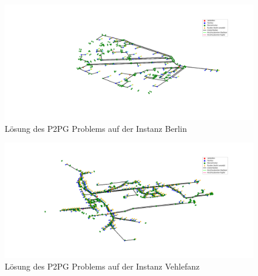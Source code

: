 \documentclass[11pt,a4paper]{article}
\theoremstyle{my_th_style1}
\begin{document}
\begin{figure}[h]
\begin{center}
	\begin{minipage}{12.0cm}
		\includegraphics[width=1\textwidth]{./Bilder/P2PG_Berlin}
		\caption{Lösung des P2PG Problems auf der Instanz Berlin}
	\end{minipage}
\end{center}
\end{figure}

\begin{figure}
\begin{center}
	\begin{minipage}{12.0cm}
		\includegraphics[width=1\textwidth]{./Bilder/P2PG_Vehlefanz}
		\caption{Lösung des P2PG Problems auf der Instanz Vehlefanz}
	\end{minipage}
\end{center}
\end{figure}

\thispagestyle{empty}
\end{document}
